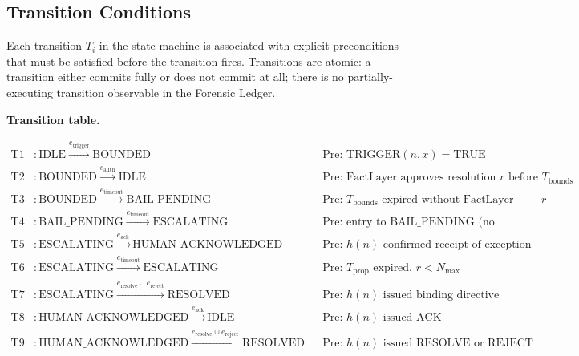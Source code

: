 \subsection{Transition Conditions}\label{sec:bailout-transitions}

Each transition $T_i$ in the state machine is associated with explicit preconditions that must be satisfied before the transition fires. Transitions are atomic: a transition either commits fully or does not commit at all; there is no partially-executing transition observable in the Forensic Ledger.

\bigskip
\noindent\textbf{Transition table.}

\begin{align}
\text{T1} &: \text{IDLE} \xrightarrow{e_{\text{trigger}}} \text{BOUNDED} && \text{Pre: } \text{TRIGGER}(n, x) = \text{TRUE} \tag{T1} \\
\text{T2} &: \text{BOUNDED} \xrightarrow{e_{\text{auth}}} \text{IDLE} && \text{Pre: } \text{FactLayer approves resolution } r \text{ before } T_{\text{bounds}} \tag{T2} \\
\text{T3} &: \text{BOUNDED} \xrightarrow{e_{\text{timeout}}} \text{BAIL\_PENDING} && \text{Pre: } T_{\text{bounds}} \text{ expired without FactLayer-approved } r \tag{T3} \\
\text{T4} &: \text{BAIL\_PENDING} \xrightarrow{e_{\text{timeout}}} \text{ESCALATING} && \text{Pre: } \text{entry to BAIL\_PENDING (no dwell, no gate)} \tag{T4} \\
\text{T5} &: \text{ESCALATING} \xrightarrow{e_{\text{ack}}} \text{HUMAN\_ACKNOWLEDGED} && \text{Pre: } h(n) \text{ confirmed receipt of exception} \tag{T5} \\
\text{T6} &: \text{ESCALATING} \xrightarrow{e_{\text{timeout}}} \text{ESCALATING} && \text{Pre: } T_{\text{prop}} \text{ expired, } r < N_{\max} \tag{T6} \\
\text{T7} &: \text{ESCALATING} \xrightarrow{e_{\text{resolve}} \cup e_{\text{reject}}} \text{RESOLVED} && \text{Pre: } h(n) \text{ issued binding directive} \tag{T7} \\
\text{T8} &: \text{HUMAN\_ACKNOWLEDGED} \xrightarrow{e_{\text{ack}}} \text{IDLE} && \text{Pre: } h(n) \text{ issued ACK} \tag{T8} \\
\text{T9} &: \text{HUMAN\_ACKNOWLEDGED} \xrightarrow{e_{\text{resolve}} \cup e_{\text{reject}}} \text{RESOLVED} && \text{Pre: } h(n) \text{ issued RESOLVE or REJECT} \tag{T9}
\end{align}

